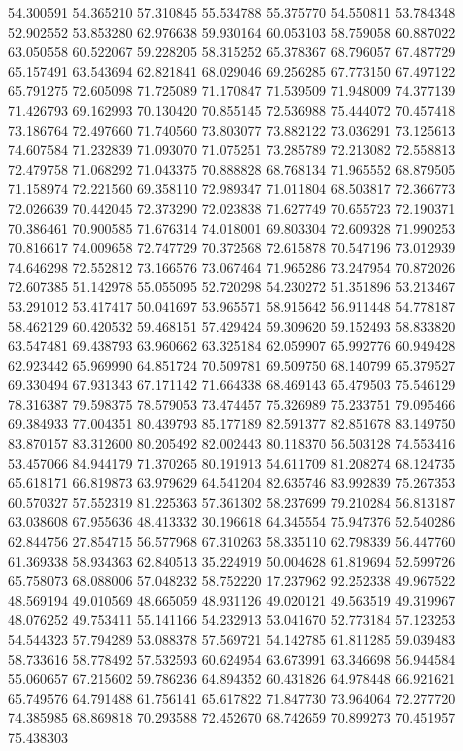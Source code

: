 54.300591
54.365210
57.310845
55.534788
55.375770
54.550811
53.784348
52.902552
53.853280
62.976638
59.930164
60.053103
58.759058
60.887022
63.050558
60.522067
59.228205
58.315252
65.378367
68.796057
67.487729
65.157491
63.543694
62.821841
68.029046
69.256285
67.773150
67.497122
65.791275
72.605098
71.725089
71.170847
71.539509
71.948009
74.377139
71.426793
69.162993
70.130420
70.855145
72.536988
75.444072
70.457418
73.186764
72.497660
71.740560
73.803077
73.882122
73.036291
73.125613
74.607584
71.232839
71.093070
71.075251
73.285789
72.213082
72.558813
72.479758
71.068292
71.043375
70.888828
68.768134
71.965552
68.879505
71.158974
72.221560
69.358110
72.989347
71.011804
68.503817
72.366773
72.026639
70.442045
72.373290
72.023838
71.627749
70.655723
72.190371
70.386461
70.900585
71.676314
74.018001
69.803304
72.609328
71.990253
70.816617
74.009658
72.747729
70.372568
72.615878
70.547196
73.012939
74.646298
72.552812
73.166576
73.067464
71.965286
73.247954
70.872026
72.607385
51.142978
55.055095
52.720298
54.230272
51.351896
53.213467
53.291012
53.417417
50.041697
53.965571
58.915642
56.911448
54.778187
58.462129
60.420532
59.468151
57.429424
59.309620
59.152493
58.833820
63.547481
69.438793
63.960662
63.325184
62.059907
65.992776
60.949428
62.923442
65.969990
64.851724
70.509781
69.509750
68.140799
65.379527
69.330494
67.931343
67.171142
71.664338
68.469143
65.479503
75.546129
78.316387
79.598375
78.579053
73.474457
75.326989
75.233751
79.095466
69.384933
77.004351
80.439793
85.177189
82.591377
82.851678
83.149750
83.870157
83.312600
80.205492
82.002443
80.118370
56.503128
74.553416
53.457066
84.944179
71.370265
80.191913
54.611709
81.208274
68.124735
65.618171
66.819873
63.979629
64.541204
82.635746
83.992839
75.267353
60.570327
57.552319
81.225363
57.361302
58.237699
79.210284
56.813187
63.038608
67.955636
48.413332
30.196618
64.345554
75.947376
52.540286
62.844756
27.854715
56.577968
67.310263
58.335110
62.798339
56.447760
61.369338
58.934363
62.840513
35.224919
50.004628
61.819694
52.599726
65.758073
68.088006
57.048232
58.752220
17.237962
92.252338
49.967522
48.569194
49.010569
48.665059
48.931126
49.020121
49.563519
49.319967
48.076252
49.753411
55.141166
54.232913
53.041670
52.773184
57.123253
54.544323
57.794289
53.088378
57.569721
54.142785
61.811285
59.039483
58.733616
58.778492
57.532593
60.624954
63.673991
63.346698
56.944584
55.060657
67.215602
59.786236
64.894352
60.431826
64.978448
66.921621
65.749576
64.791488
61.756141
65.617822
71.847730
73.964064
72.277720
74.385985
68.869818
70.293588
72.452670
68.742659
70.899273
70.451957
75.438303
